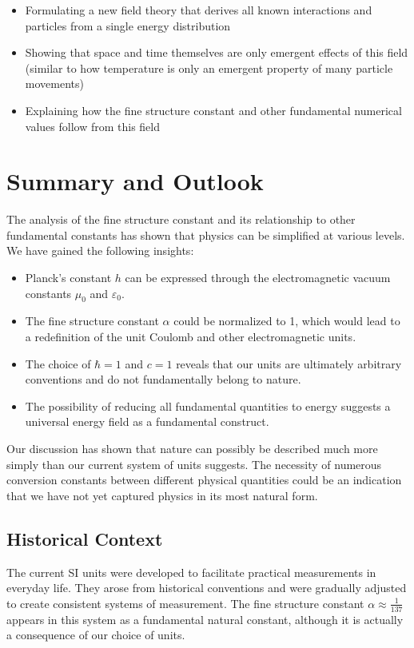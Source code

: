 \documentclass{article}
\begin{document}
\begin{itemize}
	\item Formulating a new field theory that derives all known interactions and particles from a single energy distribution
	\item Showing that space and time themselves are only emergent effects of this field (similar to how temperature is only an emergent property of many particle movements)
	\item Explaining how the fine structure constant and other fundamental numerical values follow from this field
\end{itemize}

\section{Summary and Outlook}

The analysis of the fine structure constant and its relationship to other fundamental constants has shown that physics can be simplified at various levels. We have gained the following insights:

\begin{itemize}
	\item Planck's constant $h$ can be expressed through the electromagnetic vacuum constants $\mu_0$ and $\varepsilon_0$.
	\item The fine structure constant $\alpha$ could be normalized to 1, which would lead to a redefinition of the unit Coulomb and other electromagnetic units.
	\item The choice of $\hbar = 1$ and $c = 1$ reveals that our units are ultimately arbitrary conventions and do not fundamentally belong to nature.
	\item The possibility of reducing all fundamental quantities to energy suggests a universal energy field as a fundamental construct.
\end{itemize}

Our discussion has shown that nature can possibly be described much more simply than our current system of units suggests. The necessity of numerous conversion constants between different physical quantities could be an indication that we have not yet captured physics in its most natural form.

\subsection{Historical Context}

The current SI units were developed to facilitate practical measurements in everyday life. They arose from historical conventions and were gradually adjusted to create consistent systems of measurement. The fine structure constant $\alpha \approx \frac{1}{137}$ appears in this system as a fundamental natural constant, although it is actually a consequence of our choice of units.
\end{document}

